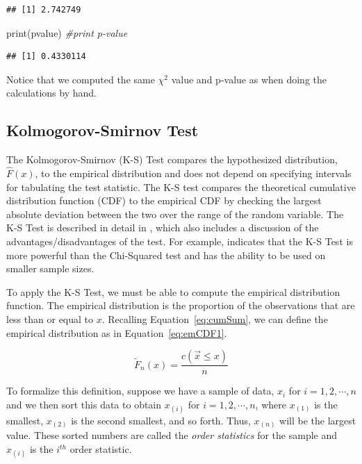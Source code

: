 \documentclass[
]{book}
\newenvironment{Shaded}{\begin{snugshade}}{\end{snugshade}}
\newcommand{\CommentTok}[1]{\textcolor[rgb]{0.56,0.35,0.01}{\textit{#1}}}
\newcommand{\FunctionTok}[1]{\textcolor[rgb]{0.00,0.00,0.00}{#1}}
\newcommand{\NormalTok}[1]{#1}
\theoremstyle{definition}
\theoremstyle{definition}
\theoremstyle{definition}
\theoremstyle{definition}
\theoremstyle{remark}
\begin{document}
\begin{verbatim}
## [1] 2.742749
\end{verbatim}

\begin{Shaded}
\begin{Highlighting}[]
\FunctionTok{print}\NormalTok{(pvalue) }\CommentTok{\#print p{-}value}
\end{Highlighting}
\end{Shaded}

\begin{verbatim}
## [1] 0.4330114
\end{verbatim}

Notice that we computed the same \(\chi^{2}\) value and p-value as when doing the calculations by hand.

\hypertarget{kolmogorov-smirnov-test}{%
\subsection{Kolmogorov-Smirnov Test}\label{kolmogorov-smirnov-test}}

The Kolmogorov-Smirnov (K-S) Test compares the hypothesized
distribution, \(\hat{F}(x)\), to the empirical distribution and does not
depend on specifying intervals for tabulating the test statistic. The
K-S test compares the theoretical cumulative distribution function (CDF)
to the empirical CDF by checking the largest absolute deviation between
the two over the range of the random variable. The K-S Test is described
in detail in \citep{law2007simulation}, which also includes a discussion of
the advantages/disadvantages of the test. For example,
\citep{law2007simulation} indicates that the K-S Test is more powerful than
the Chi-Squared test and has the ability to be used on smaller sample
sizes.

To apply the K-S Test, we must be able to compute the empirical
distribution function. The empirical distribution is the proportion of
the observations that are less than or equal to \(x\). Recalling
Equation~\eqref{eq:cumSum}, we can define the empirical distribution as in
Equation~\eqref{eq:emCDF1}.

\begin{equation}
\tilde{F}_{n} \left( x \right)  = \frac{c(\vec{x} \leq x)}{n}
\label{eq:emCDF1}
\end{equation}

To formalize this definition, suppose we have a sample of data, \(x_{i}\)
for \(i=1, 2, \cdots, n\) and we then sort this data to obtain \(x_{(i)}\)
for \(i=1, 2, \cdots, n\), where \(x_{(1)}\) is the smallest, \(x_{(2)}\) is
the second smallest, and so forth. Thus, \(x_{(n)}\) will be the largest
value. These sorted numbers are called the \emph{order statistics} for the
sample and \(x_{(i)}\) is the \(i^{th}\) order statistic.
\end{document}
